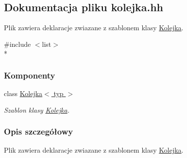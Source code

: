 \hypertarget{kolejka_8hh}{\subsection{Dokumentacja pliku kolejka.\-hh}
\label{kolejka_8hh}
}


Plik zawiera deklaracje zwiazane z szablonem klasy \hyperlink{class_kolejka}{Kolejka}.  


{\ttfamily \#include $<$list$>$}\\*
\subsubsection*{Komponenty}
\begin{DoxyCompactItemize}
\item 
class \hyperlink{class_kolejka}{Kolejka$<$ typ $>$}
\begin{DoxyCompactList}\small\item\em Szablon klasy \hyperlink{class_kolejka}{Kolejka}. \end{DoxyCompactList}\end{DoxyCompactItemize}


\subsubsection{Opis szczegółowy}
Plik zawiera deklaracje zwiazane z szablonem klasy \hyperlink{class_kolejka}{Kolejka}. 